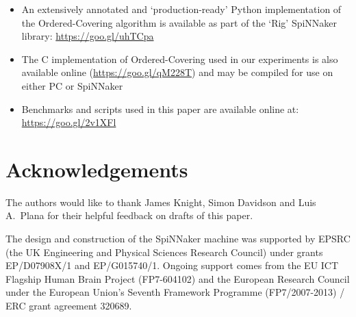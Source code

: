 \documentclass[conference]{IEEEtran}
\begin{document}
\small
\begin{itemize}
  \item An extensively annotated and `production-ready' Python implementation of the Ordered-Covering algorithm is available as part of the `Rig' SpiNNaker library: \url{https://goo.gl/uhTCpa}
  \item The C implementation of Ordered-Covering used in our experiments is also available online (\url{https://goo.gl/qM228T}) and may be compiled for use on either PC or SpiNNaker
  \item Benchmarks and scripts used in this paper are available online at: \url{https://goo.gl/2v1XFl}
\end{itemize}

\section*{Acknowledgements}
\small The authors would like to thank James Knight, Simon Davidson and Luis A.\ Plana for their helpful feedback on drafts of this paper.

The design and construction of the SpiNNaker machine was supported by EPSRC (the UK Engineering and Physical Sciences Research Council) under grants EP/D07908X/1 and EP/G015740/1.
Ongoing support comes from the EU ICT Flagship Human Brain Project (FP7-604102) and the European Research Council under the European Union's Seventh Framework Programme (FP7/2007-2013) / ERC grant agreement 320689.

\newpage
\printbibliography
\end{document}
